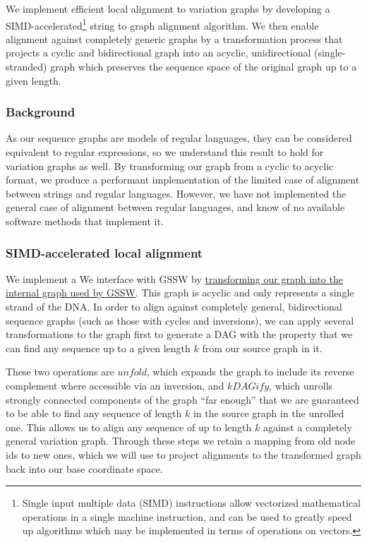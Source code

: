 \documentclass[12pt]{article}
\begin{document}
{}



\appendix


We implement efficient local alignment to variation graphs by developing a SIMD-accelerated\footnote{Single input multiple data (SIMD) instructions allow vectorized mathematical operations in a single machine instruction, and can be used to greatly speed up algorithms which may be implemented in terms of operations on vectors.} string to graph alignment algorithm. We then enable alignment against completely generic graphs by a transformation process that projects a cyclic and bidirectional graph into an acyclic, unidirectional (single-stranded) graph which preserves the sequence space of the original graph up to a given length.

\subsubsection{Background}


As our sequence graphs are models of regular languages, they can be considered equivalent to regular expressions, so we understand this result to hold for variation graphs as well.
By transforming our graph from a cyclic to acyclic format, we produce a performant implementation of the limited case of alignment between strings and regular languages. However, we have not implemented the general case of alignment between regular languages, and know of no available software methods that implement it.

\subsubsection{SIMD-accelerated local alignment}

We implement a 
We interface with GSSW by \href{https://github.com/vgteam/vg/blob/fbcb6e62/src/vg.cpp#L6461-L6532}{transforming our graph into the internal graph used by GSSW}.
This graph is acyclic and only represents a single strand of the DNA.
In order to align against completely general, bidirectional sequence graphs (such as those with cycles and inversions), we can apply several transformations to the graph first to generate a DAG with the property that we can find any sequence up to a given length $k$ from our source graph in it.

These two operations are $unfold$, which expands the graph to include its reverse complement where accessible via an inversion, and $kDAGify$, which unrolls strongly connected components of the graph ``far enough'' that we are guaranteed to be able to find any sequence of length $k$ in the source graph in the unrolled one.
This allows us to align any sequence of up to length $k$ against a completely general variation graph.
Through these steps we retain a mapping from old node ids to new ones, which we will use to project alignments to the transformed graph back into our base coordinate space.
\end{document}

